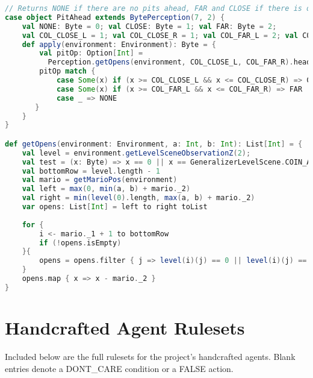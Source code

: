 \begin{minipage}{0.9\linewidth}
\begin{lstlisting}[language=scala, basicstyle=\scriptsize\ttfamily, caption={Pit detection in the perceptions classes.}, label={lst:prcptpit}]
// Returns NONE if there are no pits ahead, FAR and CLOSE if there is one in a certain number of columns relative to mario.
case object PitAhead extends BytePerception(7, 2) {
    val NONE: Byte = 0; val CLOSE: Byte = 1; val FAR: Byte = 2;
    val COL_CLOSE_L = 1; val COL_CLOSE_R = 1; val COL_FAR_L = 2; val COL_FAR_R = 2
    def apply(environment: Environment): Byte = {
        val pitOp: Option[Int] = 
          Perception.getOpens(environment, COL_CLOSE_L, COL_FAR_R).headOption
        pitOp match {
            case Some(x) if (x >= COL_CLOSE_L && x <= COL_CLOSE_R) => CLOSE
            case Some(x) if (x >= COL_FAR_L && x <= COL_FAR_R) => FAR
            case _ => NONE
       }
    }
}

def getOpens(environment: Environment, a: Int, b: Int): List[Int] = {
    val level = environment.getLevelSceneObservationZ(2);
    val test = (x: Byte) => x == 0 || x == GeneralizerLevelScene.COIN_ANIM;
    val bottomRow = level.length - 1
    val mario = getMarioPos(environment)
    val left = max(0, min(a, b) + mario._2)
    val right = min(level(0).length, max(a, b) + mario._2)   
    var opens: List[Int] = left to right toList
    
    for {
        i <- mario._1 + 1 to bottomRow
        if (!opens.isEmpty)
    }{
        opens = opens.filter { j => level(i)(j) == 0 || level(i)(j) == GeneralizerLevelScene.COIN_ANIM }
    }
    opens.map { x => x - mario._2 }
}
\end{lstlisting}
\end{minipage}

\section{Handcrafted Agent Rulesets}
\label{app:har}
\setcounter{table}{0}

Included below are the full rulesets for the project's handcrafted agents. Blank entries denote a {\footnotesize DONT\_CARE} condition or a {\footnotesize FALSE} action.
\vspace{\baselineskip}

